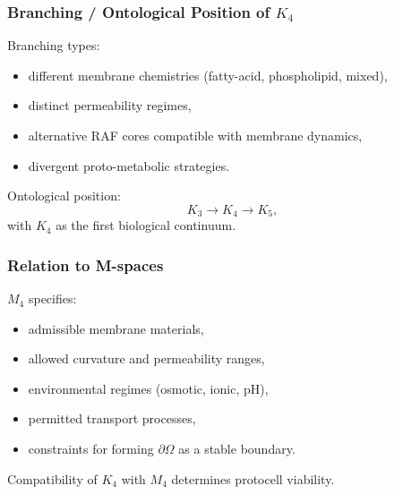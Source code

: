 \subsubsection{Branching / Ontological Position of \texorpdfstring{$K_4$}{K_4}}

Branching types:
\begin{itemize}
    \item different membrane chemistries (fatty-acid, phospholipid,
          mixed),
    \item distinct permeability regimes,
    \item alternative RAF cores compatible with membrane dynamics,
    \item divergent proto-metabolic strategies.
\end{itemize}

Ontological position:
\[
K_3 \to K_4 \to K_5,
\]
with $K_4$ as the first biological continuum.

\subsubsection{Relation to M-spaces}

$M_4$ specifies:
\begin{itemize}
    \item admissible membrane materials,
    \item allowed curvature and permeability ranges,
    \item environmental regimes (osmotic, ionic, pH),
    \item permitted transport processes,
    \item constraints for forming $\partial\Omega$ as a stable boundary.
\end{itemize}

Compatibility of $K_4$ with $M_4$ determines protocell viability.
